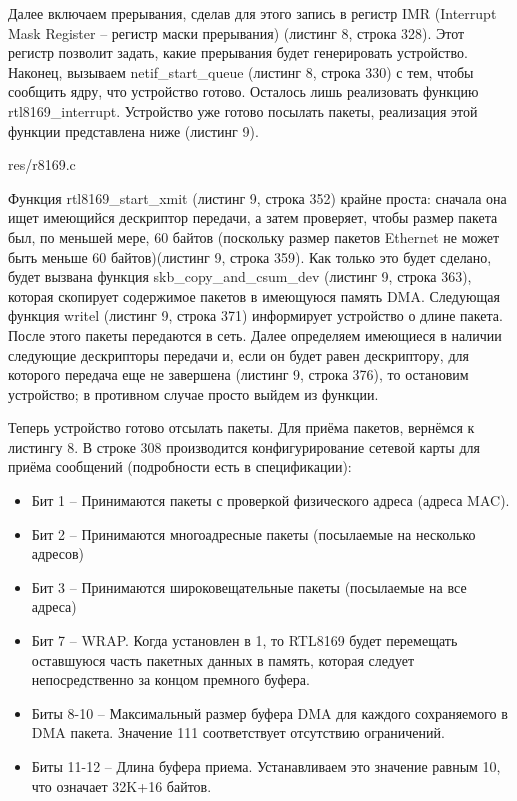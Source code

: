 Далее включаем прерывания, сделав для этого запись в регистр IMR (Interrupt Mask Register – регистр маски прерывания) (листинг 8, строка 328). Этот регистр позволит задать, какие прерывания будет генерировать устройство. Наконец, вызываем netif\_start\_queue (листинг 8, строка 330) с тем, чтобы сообщить ядру, что устройство готово. Осталось лишь реализовать функцию rtl8169\_interrupt. Устройство уже готово посылать пакеты, реализация этой функции представлена ниже (листинг 9).


{res/r8169.c}

Функция rtl8169\_start\_xmit (листинг 9, строка 352) крайне проста: сначала она ищет имеющийся дескриптор передачи, а затем проверяет, чтобы размер пакета был, по меньшей мере, 60 байтов (поскольку размер пакетов Ethernet не может быть меньше 60 байтов)(листинг 9, строка 359). Как только это будет сделано, будет вызвана функция skb\_copy\_and\_csum\_dev (листинг 9, строка 363), которая скопирует содержимое пакетов в имеющуюся память DMA. Следующая функция writel (листинг 9, строка 371) информирует устройство о длине пакета. После этого пакеты передаются в сеть. Далее определяем имеющиеся в наличии следующие дескрипторы передачи и, если он будет равен дескриптору, для которого передача еще не завершена (листинг 9, строка 376), то остановим устройство; в противном случае просто выйдем из функции.

Теперь устройство готово отсылать пакеты. Для приёма пакетов, вернёмся к листингу 8. В строке 308 производится конфигурирование сетевой карты для приёма сообщений (подробности есть в спецификации\cite{Realtech}):
\begin{itemize}
\item Бит 1 -- Принимаются пакеты с проверкой физического адреса (адреса MAC).
\item Бит 2 -- Принимаются многоадресные пакеты (посылаемые на несколько адресов)
\item Бит 3 -- Принимаются широковещательные пакеты (посылаемые на все адреса)
\item Бит 7 -- WRAP. Когда установлен в 1, то RTL8169 будет перемещать оставшуюся часть пакетных данных в память, которая следует непосредственно за концом премного буфера.
\item Биты 8-10 -- Максимальный размер буфера DMA для каждого сохраняемого в DMA пакета. Значение 111 соответствует отсутствию ограничений.
\item Биты 11-12 -- Длина буфера приема. Устанавливаем это значение равным 10, что означает 32K+16 байтов. 
\end{itemize}


